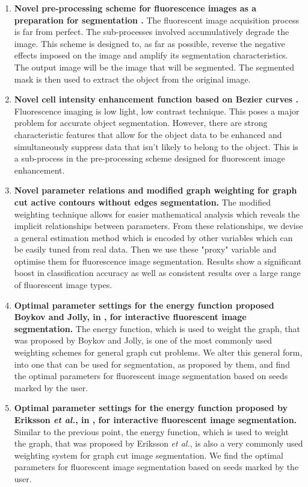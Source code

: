 \begin{enumerate}
	\item 
	\textbf{Novel pre-processing scheme for fluorescence images as a preparation for segmentation  \citep{Ryan2016}.}
	The fluorescent image acquisition process is far from perfect. The sub-processes involved accumulatively degrade the image. This scheme is designed to, as far as possible, reverse the negative effects imposed on the image and amplify its segmentation characteristics. The output image will be the image that will be segmented. The segmented mask is then used to extract the object from the original image.
	
	\item
	\textbf{Novel cell intensity enhancement function based on Bezier curves \citep{Ryan2016}.}
	Fluorescence imaging is low light, low contrast technique. This poses a major problem for accurate object segmentation. However, there are strong characteristic features that allow for the object data to be enhanced and simultaneously suppress data that isn't likely to belong to the object. This is a sub-process in the pre-processing scheme designed for fluorescent image enhancement.
	
	\item 
	\textbf{Novel parameter relations and modified graph weighting for graph cut active contours without edges segmentation.}
	The modified weighting technique allows for easier mathematical analysis which reveals the implicit relationships between parameters. From these relationships, we devise a general estimation method which is encoded by other variables which can be easily tuned from real data. Then we use these "proxy" variable and optimise them for fluorescence image segmentation. Results show a significant boost in classification accuracy as well as consistent results over a large range of fluorescent image types.
	
	\item
	\textbf{Optimal parameter settings for the energy function proposed Boykov and Jolly, in \citep{Boykov2001_2}, for interactive fluorescent image segmentation.}
	The energy function, which is used to weight the graph, that was proposed by Boykov and Jolly, is one of the most commonly used weighting schemes for general graph cut problems. We alter this general form, into one that can be used for segmentation, as proposed by them, and find the optimal parameters for fluorescent image segmentation based on seeds marked by the user.
	
	\item
	\textbf{Optimal parameter settings for the energy function proposed by Eriksson \textit{et al.}, in \citep{Eriksson2006}, for interactive fluorescent image segmentation.}
	Similar to the previous point, the energy function, which is used to weight the graph, that was proposed by  Eriksson \textit{et al.}, is also a very commonly used weighting system for graph cut image segmentation. We find the optimal parameters for fluorescent image segmentation based on seeds marked by the user.
	

\end{enumerate}
